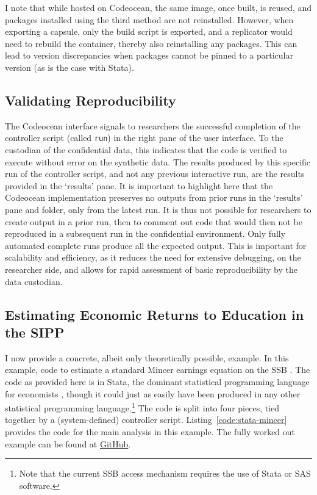 \documentclass[inline]{hdsr}
\begin{document}
I note that while hosted on Codeocean, the same image, once built, is reused, and packages installed using the third method are not reinstalled. However, when exporting a capsule, only the build script is exported, and a replicator would need to rebuild the container, thereby also reinstalling any packages. This can lead to version discrepancies when packages cannot be pinned to a particular version (as is the case with Stata). 

\subsection{Validating Reproducibility}

The Codeocean interface signals to researchers the successful completion  of the controller script (called \texttt{run}) in the right pane of the user interface. To the custodian of the confidential data, this indicates that the code is verified to execute without error on the synthetic data. The results produced by this specific run of the controller script, and not any previous interactive run, are the results provided in the `results' pane.  It is important to highlight here that the Codeocean implementation preserves no outputs from prior runs in the `results' pane and folder, only from the latest run. It is thus not possible for researchers to create output in a prior run, then to comment out code that would then not be reproduced in a subsequent run in the confidential environment. Only fully automated complete runs produce all the expected output. This is important for scalability and efficiency, as it reduces the need for extensive debugging, on the researcher side, and allows for rapid assessment of basic reproducibility by the data custodian. 




\subsection{Estimating Economic Returns to Education in the SIPP}

I now provide a concrete, albeit only theoretically possible, example. In this example, code to estimate  a standard Mincer earnings equation \citep{mincer_schooling_1984,heckman_fifty_2003} on the SSB \citep{u.s.censusbureauSIPPSyntheticBeta2015b}. The code as provided here is in Stata, the dominant statistical programming language for economists \citep{10.1257/pandp.110.764}, though it could just as easily have been produced in any other statistical programming language.\footnote{Note that the current \ac{SSB} access mechanism \citep{u.s.censusbureauSIPPSyntheticBeta2015b} requires the use of Stata or SAS software.} The code is split into four pieces, tied together by a (system-defined) controller script. Listing~\ref{code:stata-mincer} provides the code for the main analysis in this example. The fully worked out example can be found at \href{https://github.com/larsvilhuber/ssb-demo/releases/tag/v20250403}{GitHub}.
\end{document}
